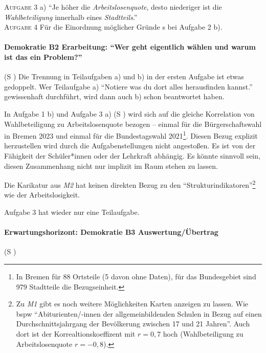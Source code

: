 \textsc{Aufgabe 3} a) \quad
\enquote{Je höher die \emph{Arbeitslosenquote}, desto niederiger ist die \emph{Wahlbeteiligung} innerhalb eines \emph{Stadtteils}.}
\\

\textsc{Aufgabe 4} \quad
Für die Einordnung möglicher Gründe \gls{s} bei Aufgabe 2 b).



\paragraph{Demokratie B2 Erarbeitung: \enquote{Wer geht eigentlich wählen und warum ist das ein Problem?}}  (\gls{S} \pageref{DEMOKRATIE-B2})
Die Trennung in Teilaufgaben a) und b) in der ersten Aufgabe ist etwas gedoppelt. Wer Teilaufgabe a) \enquote{Notiere was du dort alles herausfinden kannst.} gewissenhaft durchführt, wird dann auch b) schon beantwortet haben.

In Aufgabe 1 b) und Aufgabe 3 a) (\gls{S} \pageref{DEMOKRATIE-B3}) wird sich auf die gleiche Korrelation von Wahlbeteiligung zu Arbeitslosenquote bezogen
-- einmal für die Bürgerschaftswahl in Bremen 2023 und einmal für die Bundestagswahl 2021\footnote{
    In Bremen für 88 Ortsteile (5 davon ohne Daten), für das Bundesgebiet sind 979 Stadtteile die Bezugseinheit.}. 
Diesen Bezug explizit herzustellen wird durch die Aufgabenstellungen nicht angestoßen. Es ist von der Fähigkeit der Schüler*innen oder der Lehrkraft abhängig. Es könnte sinnvoll sein, diesen Zusammenhang nicht nur implizit im Raum stehen zu lassen.

Die Karikatur aus \emph{M2} hat keinen direkten Bezug zu den \enquote{Strukturindikatoren}\footnote{
    Zu \emph{M1} gibt es noch weitere Möglichkeiten Karten anzeigen zu lassen. Wie \gls{bspw} \enquote{Abiturienten/-innen der allgemeinbildenden Schulen in Bezug auf einen Durchschnittsjahrgang der Bevölkerung zwischen 17 und 21 Jahren}. Auch dort ist der Korrealtionskoeffizent mit $r = 0,7$ hoch (Wahlbeteiligung zu Arbeitslosenquote $r = -0,8$).
} wie der Arbeitslosigkeit. 

Aufgabe 3 hat wieder nur eine Teilaufgabe. 



\paragraph{Erwartungshorizont: Demokratie B3 Auswertung/Übertrag}  (\gls{S} \pageref{DEMOKRATIE-B3})

